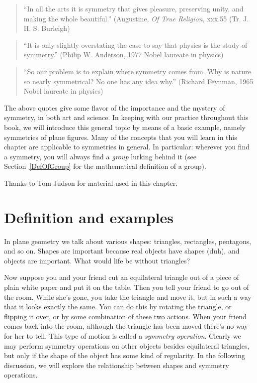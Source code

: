 


\begin{quote}
``In all the arts it is symmetry that gives pleasure, preserving unity, and making the whole beautiful.'' (Augustine, \emph{Of True Religion}, xxx.55 (Tr. J. H. S. Burleigh)
\end{quote}
\begin{quote}
``It is only slightly overstating the case to say that physics is the study of symmetry.'' (Philip W. Anderson, 1977 Nobel laureate in physics)
\end{quote}
\begin{quote}
``So our problem is to explain where symmetry comes from. Why is nature so nearly symmetrical? No one has any idea why.'' (Richard Feynman, 1965 Nobel laureate in physics)
\end{quote}

The above quotes give some flavor of the importance and the mystery of symmetry, in both art and science. In keeping with our practice throughout this book, we will introduce this general topic by means of a basic example, namely symmetries of plane figures. Many of the concepts that you will learn in this chapter are applicable to symmetries in general. In particular: wherever you find a symmetry, you will always find a \emph{group} lurking behind it (see Section~\ref{DefOfGroup} for the mathematical definition of a group).
\medskip

Thanks to Tom Judson for material used in this chapter.


\section{Definition and examples}\label{definition_examples}

In plane geometry we talk about various shapes: triangles, rectangles, pentagons, and so on. Shapes are important because real objects have shapes (duh), and objects are important. What would life be without triangles?

Now suppose you and your friend cut an equilateral triangle out of a piece of plain white paper and put it on the table. Then you tell your friend to go out of the room. While she's gone, you take the triangle and move it, but in such a way that it looks exactly the same. You can do this by rotating the triangle, or flipping it over, or by some combination of these two actions. When your friend comes back into the room, although the triangle has been moved there's no way for her to tell. This type of motion is called a \emph{symmetry operation}. Clearly we may perform symmetry operations on other objects besides equilateral triangles, but only if the shape of the object has some kind of regularity. In the following discussion, we will explore the relationship between shapes and symmetry operations. 


